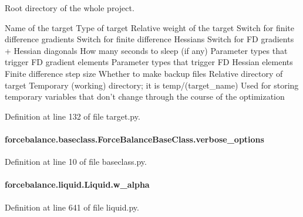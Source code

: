 Root directory of the whole project. 

Name of the target Type of target Relative weight of the target Switch for finite difference gradients Switch for finite difference Hessians Switch for F\-D gradients + Hessian diagonals How many seconds to sleep (if any) Parameter types that trigger F\-D gradient elements Parameter types that trigger F\-D Hessian elements Finite difference step size Whether to make backup files Relative directory of target Temporary (working) directory; it is temp/(target\-\_\-name) Used for storing temporary variables that don't change through the course of the optimization 

Definition at line 132 of file target.\-py.

\hypertarget{classforcebalance_1_1baseclass_1_1ForceBalanceBaseClass_a8088e1e20cbd6bc175fb9c9fe9fa0f18}{
\paragraph[{verbose\-\_\-options}]{\setlength{\rightskip}{0pt plus 5cm}forcebalance.\-baseclass.\-Force\-Balance\-Base\-Class.\-verbose\-\_\-options\hspace{0.3cm}{\ttfamily [inherited]}}}\label{classforcebalance_1_1baseclass_1_1ForceBalanceBaseClass_a8088e1e20cbd6bc175fb9c9fe9fa0f18}


Definition at line 10 of file baseclass.\-py.

\hypertarget{classforcebalance_1_1liquid_1_1Liquid_a0d36d27d8c406b53bbb1096fbb76adbb}{
\paragraph[{w\-\_\-alpha}]{\setlength{\rightskip}{0pt plus 5cm}forcebalance.\-liquid.\-Liquid.\-w\-\_\-alpha\hspace{0.3cm}{\ttfamily [inherited]}}}\label{classforcebalance_1_1liquid_1_1Liquid_a0d36d27d8c406b53bbb1096fbb76adbb}


Definition at line 641 of file liquid.\-py.

